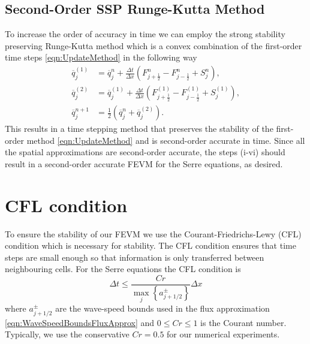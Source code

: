 \subsection{Second-Order SSP Runge-Kutta Method}
To increase the order of accuracy in time we can employ the strong stability preserving Runge-Kutta method \cite{Gottlieb-etal-2003-89} which is a convex combination of the first-order time steps \eqref{eqn:UpdateMethod} in the following way
\begin{subequations}
\begin{align}
\overline{q}_j^{(1)} &= \overline{q}^{n}_j + \frac{\Delta t}{\Delta x} \left(F^n_{j+\frac{1}{2}} - F^n_{j-\frac{1}{2}} + S^n_j\right),\\
\overline{q}_j^{(2)} &= \overline{q}_j^{(1)} + \frac{\Delta t}{\Delta x} \left(F_{j+\frac{1}{2}}^{(1)} - F_{j-\frac{1}{2}}^{(1)}  + S_j^{(1)} \right), \\
\overline{q}^{n+1}_j &= \frac{1}{2} \left( \overline{q}^n_j +  \overline{q}_j^{(2)}  \right).
\end{align}
\label{eqn:SSPRKStep1}
\end{subequations}
This results in a time stepping method that preserves the stability of the first-order method \eqref{eqn:UpdateMethod} and is second-order accurate in time. Since all the spatial approximations are second-order accurate, the steps (i-vi) should result in a second-order accurate FEVM for the Serre equations, as desired. 


\section{CFL condition}
To ensure the stability of our FEVM we use the Courant-Friedrichs-Lewy (CFL) condition \cite{Courant-etal-1967-215} which is necessary for stability. The CFL condition ensures that time steps are small enough so that information is only transferred between neighbouring cells. For the Serre equations the CFL condition is 
\begin{equation}
\Delta t \le \frac{Cr }{\max_{j} \left\lbrace a^\pm_{j+1/2} \right\rbrace} \Delta x
\label{eqn:CFLcond}
\end{equation}
where $a^\pm_{j+1/2} $ are the wave-speed bounds used in the flux approximation \eqref{eqn:WaveSpeedBoundsFluxApprox} and $0\le Cr \le 1$ is the Courant number. Typically, we use the conservative $Cr = 0.5$ for our numerical experiments. 

